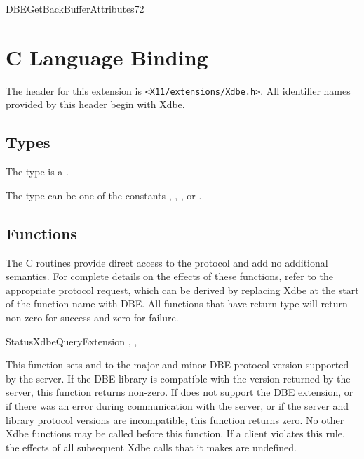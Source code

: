 \begin{erequest}{DBEGetBackBufferAttributes}{7}{2}
\areply
{}
\end{erequest}

\pagebreak[4]
\section{C Language Binding}

The header for this extension is \verb|<X11/extensions/Xdbe.h>|.  All
identifier names provided by this header begin with Xdbe.

\subsection{Types}

The type  is a .

The type  can be one of the constants
, ,
, or .

\subsection{Functions}

The C routines provide direct access to the protocol and add no
additional semantics.  For complete details on the effects of these
functions, refer to the appropriate protocol request, which can be
derived by replacing Xdbe at the start of the function name with DBE\@.
All functions that have return type  will return
non-zero for success and zero for failure.

\begin{keeptogether}
\begin{cfunction}{Status}{XdbeQueryExtension}
,
,
\end{cfunction}

This function sets  and
 to the major and minor DBE protocol
version supported by the server.  If the DBE library is compatible
with the version returned by the server, this function returns
non-zero.  If  does not support the DBE extension, or if
there was an error during communication with the server, or if the
server and library protocol versions are incompatible, this function
returns zero.  No other Xdbe functions may be called before this
function.  If a client violates this rule, the effects of all
subsequent Xdbe calls that it makes are undefined.
\end{keeptogether}

